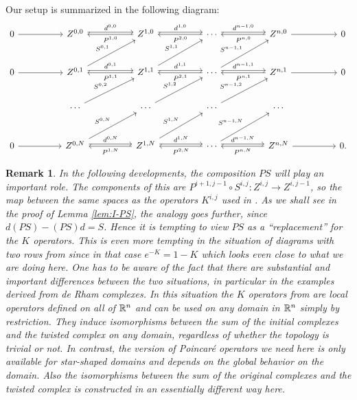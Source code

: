 \documentclass[11pt]{amsart}
\newtheorem{remark}{Remark}
\newcommand{\0}{\mathaccent23}
\begin{document}
Our setup is summarized in the following diagram:
 \begin{equation}\label{diag:multi-rows}
\begin{tikzcd}[row sep=large, column sep = huge]
0 \arrow{r} &Z^{0, 0}  \arrow[r, "d^{0, 0}", shift left=1]  &\arrow{l}{P^{1, 0}}Z^{1, 0} \arrow[r, "d^{1, 0}", shift left=1] &\arrow{l}{P^{2, 0}}\cdots \arrow[r, "d^{n-1, 0}", shift left=1] & \arrow{l}{P^{n, 0}} Z^{n, 0} \arrow{r}{} & 0\\
0 \arrow{r}&Z^{0, 1} \arrow[r, "d^{0, 1}", shift left=1]  \arrow[ur, "S^{0, 1}"]&\arrow{l}{P^{1, 1}}Z^{1, 1}  \arrow[r, "d^{1, 1}", shift left=1]  \arrow[ur, "S^{1, 1}"]&\arrow{l}{P^{2, 1}}\cdots  \arrow[r, "d^{n-1, 1}", shift left=1] \arrow[ur, "S^{n-1, 1}"]&\arrow{l}{P^{n, 1}} Z^{n, 1}\arrow{r}{} & 0\\
 & \cdots \arrow[ur, " S^{0, 2}"]&  \cdots\arrow[ur, "S^{1, 2} "]&\cdots \arrow[ur, "S^{n-1, 2} "] &\cdots & \\
 0 \arrow{r}&Z^{0, N} \arrow[r, "d^{0, N}", shift left=1]  \arrow[ur, "S^{0, N}"]&\arrow{l}{P^{1, N}}Z^{1, N}  \arrow[r, "d^{1, N}", shift left=1]  \arrow[ur, "S^{1, N}"] &\arrow{l}{P^{2, N}}\cdots  \arrow[r, "d^{n-1, N}", shift left=1] \arrow[ur, "S^{n-1, N}"] &\arrow{l}{P^{n, N}} Z^{n, N}\arrow{r}{} & 0.
 \end{tikzcd}
\end{equation}

\begin{remark}\label{rem:K}
In the following developments, the composition $PS$ will play an important role. The components of this are $P^{i+1,j-1}\circ S^{i,j}:Z^{i,j}\to Z^{i,j-1}$, so the map between the same spaces as the operators $K^{i,j}$ used in \cite{vcap2022bgg}. As we shall see in the proof of Lemma \ref{lem:I-PS}, the analogy goes further, since $d(PS)-(PS)d=S$. Hence it is tempting to view $PS$ as a ``replacement'' for the $K$ operators. This is even more tempting in the situation of diagrams with two rows from \cite{arnold2021complexes} since in that case $e^{-K}=1-K$ which looks even close to what we are doing here. One has to be aware of the fact that there are substantial and important differences between the two situations, in particular in the examples derived from de Rham complexes. In this situation the $K$ operators from \cite{vcap2022bgg} are local operators defined on all of $\Bbb R^n$ and can be used on \textit{any} domain in $\Bbb R^n$ simply by restriction. They induce isomorphisms between the sum of the initial complexes and the twisted complex on any domain, regardless of whether the topology is trivial or not. In contrast, the version of Poincar\'e operators we need here is only available for star-shaped domains and depends on the global behavior on the domain. Also the isomorphisms between the sum of the original complexes and the twisted complex is constructed in an essentially different way here. 
  \end{remark}
 
\end{document}
